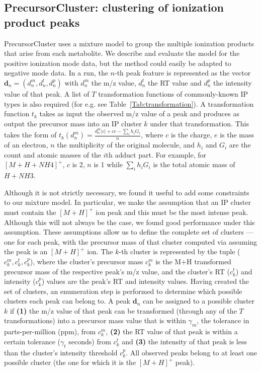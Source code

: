 \subsection{PrecursorCluster: clustering of ionization product peaks\label{sub:ip-clustering}}

PrecursorCluster uses a mixture model to group the multiple ionization products that arise from each metabolite. We describe and evaluate the model for the positive ionization mode data, but the method could easily be adapted to negative mode data. In a run, the $n$-th peak feature is represented as the vector $\textbf{d}_n=(d_n^m,d_n^t,d_n^p)$ with $d_n^m$ the m/z value, $d_n^t$ the RT value and $d_n^p$ the intensity value of that peak. A list of $T$ transformation functions of commonly-known IP types is also required (for e.g. see Table~\ref{Tab:transformation}). A transformation function $t_k$ takes as input the observed m/z value of a peak and produces as output the precursor mass into an IP cluster $k$ under that transformation. This takes the form of $t_k(d_n^m) = \frac{d_n^m|c|+ce-\sum_{i} h_i G_i}{n}$, where $c$ is the charge, $e$ is the mass of an electron, $n$ the multiplicity of the original molecule, and $h_i$ and $G_i$ are the count and atomic masses of the $i$th adduct part. For example, for $[M+H+NH4]^+$, $c$ is 2, $n$ is 1 while $\sum_{i} h_i G_i$ is the total atomic mass of $H+NH3$.

Although it is not strictly necessary, we found it useful to add some constraints to our mixture model. In particular, we make the assumption that an IP cluster must contain the $[M+H]^+$ ion peak and this must be the most intense peak. Although this will not always be the case, we found good performance under this assumption. These assumptions allow us to define the complete set of clusters --- one for each peak, with the precursor mass of that cluster computed via assuming the peak is an $[M+H]^+$ ion. The $k$-th cluster is represented by the tuple ($c_k^m,c_k^t,c_k^p$), where the cluster's precursor mass $c_k^m$ is the M+H transformed precursor mass of the respective peak's m/z value, and the cluster's RT ($c_k^t$) and intensity ($c_k^p$) values are the peak's RT and intensity values. Having created the set of clusters, an enumeration step is performed to determine which possible clusters each peak can belong to. A peak $\textbf{d}_n$ can be assigned to a possible cluster $k$ if \textbf{(1)} the m/z value of that peak can be transformed (through any of the $T$ transformations) into a precursor mass value that is within $\gamma_m$, the tolerance in parts-per-million (ppm), from $c_k^m$, \textbf{(2)} the RT value of that peak is within a certain tolerance ($\gamma_t$ seconds) from $c_k^t$ and \textbf{(3)} the intensity of that peak is less than the cluster's intensity threshold $c_k^p$. All observed peaks belong to at least one possible cluster (the one for which it is the $[M+H]^+$ peak).

